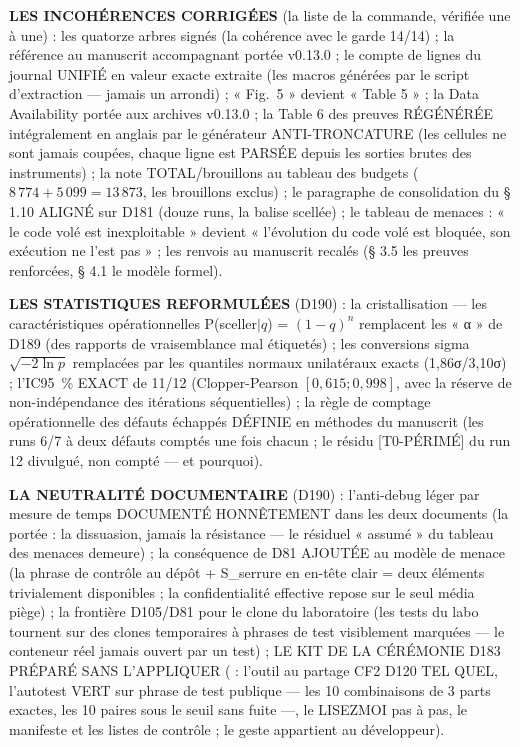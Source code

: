 \textbf{LES INCOHÉRENCES CORRIGÉES} (la liste de la commande, vérifiée une à
une) : les quatorze arbres signés (la cohérence avec le garde 14/14) ; la
référence au manuscrit accompagnant portée v0.13.0 ; le compte de lignes du
journal UNIFIÉ en valeur exacte extraite (les macros générées par le script
d'extraction — jamais un arrondi) ; « Fig.~5 » devient « Table 5 » ; la Data
Availability portée aux archives v0.13.0 ; la Table 6 des preuves RÉGÉNÉRÉE
intégralement en anglais par le générateur ANTI-TRONCATURE (les cellules ne
sont jamais coupées, chaque ligne est PARSÉE depuis les sorties brutes des
instruments) ; la note TOTAL/brouillons au tableau des budgets ($8\,774 +
5\,099 = 13\,873$, les brouillons exclus) ; le paragraphe de consolidation
du § 1.10 ALIGNÉ sur D181 (douze runs, la balise  scellée) ;
le tableau de menaces : « le code volé est inexploitable » devient
« l'évolution du code volé est bloquée, son exécution ne l'est pas » ; les
renvois au manuscrit recalés (§ 3.5 les preuves renforcées, § 4.1 le modèle
formel).

\textbf{LES STATISTIQUES REFORMULÉES} (D190) : la cristallisation — les
caractéristiques opérationnelles P(sceller$|q$) = $(1-q)^n$ remplacent les
« α » de D189 (des rapports de vraisemblance mal étiquetés) ; les conversions
sigma $\sqrt{-2\ln p}$ remplacées par les quantiles normaux unilatéraux
exacts (1,86σ/3,10σ) ; l'IC95~\% EXACT de 11/12 (Clopper-Pearson
$[0,615 ; 0,998]$, avec la réserve de non-indépendance des itérations
séquentielles) ; la règle de comptage opérationnelle des défauts échappés
DÉFINIE en méthodes du manuscrit (les runs 6/7 à deux défauts comptés une
fois chacun ; le résidu [T0-PÉRIMÉ] du run 12 divulgué, non compté — et
pourquoi).

\textbf{LA NEUTRALITÉ DOCUMENTAIRE} (D190) : l'anti-debug léger par mesure
de temps DOCUMENTÉ HONNÊTEMENT dans les deux documents (la portée : la
dissuasion, jamais la résistance — le résiduel « assumé » du tableau des
menaces demeure) ; la conséquence de D81 AJOUTÉE au modèle de menace (la
phrase de contrôle au dépôt + S\_serrure en en-tête clair = deux éléments
trivialement disponibles ; la confidentialité effective repose sur le seul
média piège) ; la frontière D105/D81 pour le clone du laboratoire (les tests
du labo tournent sur des clones temporaires à phrases de test visiblement
marquées — le conteneur réel jamais ouvert par un test) ; LE KIT DE LA
CÉRÉMONIE D183 PRÉPARÉ SANS L'APPLIQUER ( :
l'outil au partage CF2 D120 TEL QUEL, l'autotest VERT sur phrase de test
publique — les 10 combinaisons de 3 parts exactes, les 10 paires sous le
seuil sans fuite —, le LISEZMOI pas à pas, le manifeste et les listes de
contrôle ; le geste appartient au développeur).

